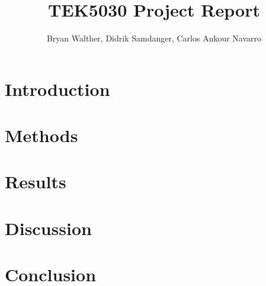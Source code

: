 \documentclass[12pt]{article}
\title{TEK5030 Project Report}
\author{Bryan Walther, Didrik Samdanger, Carlos Ankour Navarro}
\begin{document}
\maketitle

\section{Introduction}
\section{Methods}
\section{Results}

\section{Discussion}
\section{Conclusion}
\end{document}
